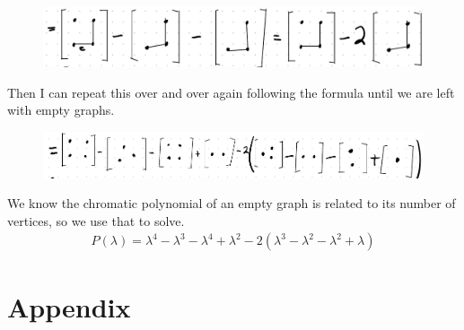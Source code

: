 \documentclass[12pt,letterpaper]{article} \usepackage{amsmath} \usepackage{graphicx}  \usepackage{longtable}  \usepackage{amssymb}
\begin{document}
\begin{mdframed}
            \begin{figure}[H]
                \centering
                \includegraphics[width=0.8\linewidth]{ex10 4.png}
            \end{figure}

            Then I can repeat this over and over again following the formula until we are left with empty graphs.

            \begin{figure}[H]
                \centering
                \includegraphics[width=0.9\linewidth]{ex10 5.png}
            \end{figure}

            We know the chromatic polynomial of an empty graph is related to its number of vertices, so we use that to solve.
            \begin{align*}
                P(\lambda) = \lambda^4-\lambda^3-\lambda^4+\lambda^2-2(\lambda^3-\lambda^2-\lambda^2+\lambda)
            \end{align*}
        \end{mdframed}

    \pagebreak
    \section{Appendix}
\end{document}
